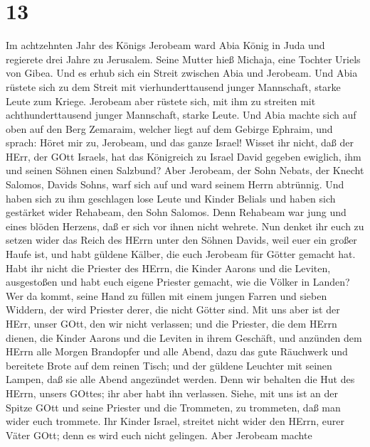 \hypertarget{section-12}{%
\section{13}\label{section-12}}

 Im achtzehnten Jahr des Königs Jerobeam ward Abia König in
Juda  und regierete drei Jahre zu Jerusalem. Seine Mutter
hieß Michaja, eine Tochter Uriels von Gibea. Und es erhub sich ein
Streit zwischen Abia und Jerobeam.  Und Abia rüstete sich zu
dem Streit mit vierhunderttausend junger Mannschaft, starke Leute zum
Kriege. Jerobeam aber rüstete sich, mit ihm zu streiten mit
achthunderttausend junger Mannschaft, starke Leute.  Und
Abia machte sich auf oben auf den Berg Zemaraim, welcher liegt auf dem
Gebirge Ephraim, und sprach: Höret mir zu, Jerobeam, und das ganze
Israel!  Wisset ihr nicht, daß der HErr, der GOtt Israels,
hat das Königreich zu Israel David gegeben ewiglich, ihm und seinen
Söhnen einen Salzbund?  Aber Jerobeam, der Sohn Nebats, der
Knecht Salomos, Davids Sohns, warf sich auf und ward seinem Herrn
abtrünnig.  Und haben sich zu ihm geschlagen lose Leute und
Kinder Belials und haben sich gestärket wider Rehabeam, den Sohn
Salomos. Denn Rehabeam war jung und eines blöden Herzens, daß er sich
vor ihnen nicht wehrete.  Nun denket ihr euch zu setzen
wider das Reich des HErrn unter den Söhnen Davids, weil euer ein großer
Haufe ist, und habt güldene Kälber, die euch Jerobeam für Götter gemacht
hat.  Habt ihr nicht die Priester des HErrn, die Kinder
Aarons und die Leviten, ausgestoßen und habt euch eigene Priester
gemacht, wie die Völker in Landen? Wer da kommt, seine Hand zu füllen
mit einem jungen Farren und sieben Widdern, der wird Priester derer, die
nicht Götter sind.  Mit uns aber ist der HErr, unser GOtt,
den wir nicht verlassen; und die Priester, die dem HErrn dienen, die
Kinder Aarons und die Leviten in ihrem Geschäft,  und
anzünden dem HErrn alle Morgen Brandopfer und alle Abend, dazu das gute
Räuchwerk und bereitete Brote auf dem reinen Tisch; und der güldene
Leuchter mit seinen Lampen, daß sie alle Abend angezündet werden. Denn
wir behalten die Hut des HErrn, unsers GOttes; ihr aber habt ihn
verlassen.  Siehe, mit uns ist an der Spitze GOtt und seine
Priester und die Trommeten, zu trommeten, daß man wider euch trommete.
Ihr Kinder Israel, streitet nicht wider den HErrn, eurer Väter GOtt;
denn es wird euch nicht gelingen.  Aber Jerobeam machte
